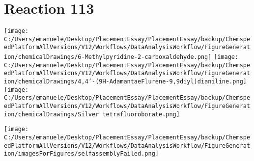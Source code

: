 \documentclass{article}%
\begin{document}
\section*{Reaction 113}%
%
\begin{scheme}[H]%
\begin{minipage}{0.5\textwidth}%
\texttt{[image: C:/Users/emanuele/Desktop/PlacementEssay/PlacementEssay/backup/ChemspeedPlatformAllVersions/V12/Workflows/DataAnalysisWorkflow/FigureGeneration/chemicalDrawings/6-Methylpyridine-2-carboxaldehyde.png]}%
\texttt{[image: C:/Users/emanuele/Desktop/PlacementEssay/PlacementEssay/backup/ChemspeedPlatformAllVersions/V12/Workflows/DataAnalysisWorkflow/FigureGeneration/chemicalDrawings/4,4'-(9H-AdamantaeFlurene-9,9diyl)dianiline.png]}%
\texttt{[image: C:/Users/emanuele/Desktop/PlacementEssay/PlacementEssay/backup/ChemspeedPlatformAllVersions/V12/Workflows/DataAnalysisWorkflow/FigureGeneration/chemicalDrawings/Silver tetrafluoroborate.png]}%
\end{minipage}%
\begin{minipage}{0.5\textwidth}%
\begin{center}%
\texttt{[image: C:/Users/emanuele/Desktop/PlacementEssay/PlacementEssay/backup/ChemspeedPlatformAllVersions/V12/Workflows/DataAnalysisWorkflow/FigureGeneration/imagesForFigures/selfassemblyFailed.png]}%
\end{center}%
\end{minipage}%
\caption{Self-assembly of components 8, 13, with Silver(I) in a 3.0:1.5:1.0 molar ratio in CH$_3$CN at 60\textdegree C for 40h. These are the reagents (starting materials) for reaction 113.}%
\end{scheme}%
\end{document}

